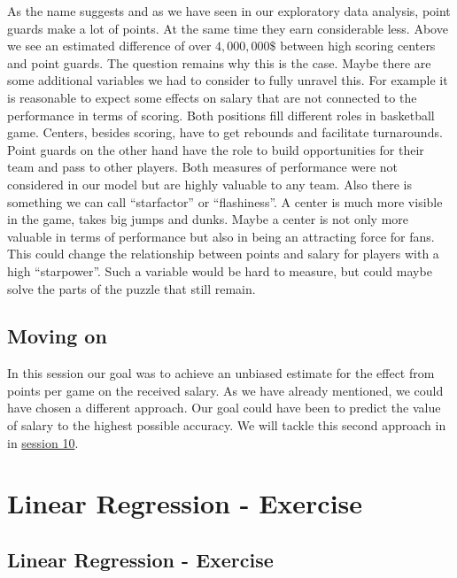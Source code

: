 \documentclass[
]{book}
\begin{document}
As the name suggests and as we have seen in our exploratory data
analysis, point guards make a lot of points. At the same time they earn
considerable less. Above we see an estimated difference of over
\(4,000,000\$\) between high scoring centers and point guards. The
question remains why this is the case. Maybe there are some additional
variables we had to consider to fully unravel this. For example it is
reasonable to expect some effects on salary that are not connected to
the performance in terms of scoring. Both positions fill different roles
in basketball game. Centers, besides scoring, have to get rebounds and
facilitate turnarounds. Point guards on the other hand have the role to
build opportunities for their team and pass to other players. Both
measures of performance were not considered in our model but are highly
valuable to any team. Also there is something we can call ``starfactor''
or ``flashiness''. A center is much more visible in the game, takes big
jumps and dunks. Maybe a center is not only more valuable in terms of
performance but also in being an attracting force for fans. This could
change the relationship between points and salary for players with a
high ``starpower''. Such a variable would be hard to measure, but could
maybe solve the parts of the puzzle that still remain.

\hypertarget{moving-on-3}{%
\section{Moving on}\label{moving-on-3}}

In this session our goal was to achieve an unbiased estimate for the effect
from points per game on the received salary. As we have already mentioned,
we could have chosen a different approach. Our goal could have been to predict
the value of salary to the highest possible accuracy. We will tackle this
second approach in in \protect\hyperlink{pm-t}{session 10}.

\hypertarget{lin-e}{%
\chapter{Linear Regression - Exercise}\label{lin-e}}

\hypertarget{linear-regression---exercise}{%
\section{Linear Regression - Exercise}\label{linear-regression---exercise}}
\end{document}
